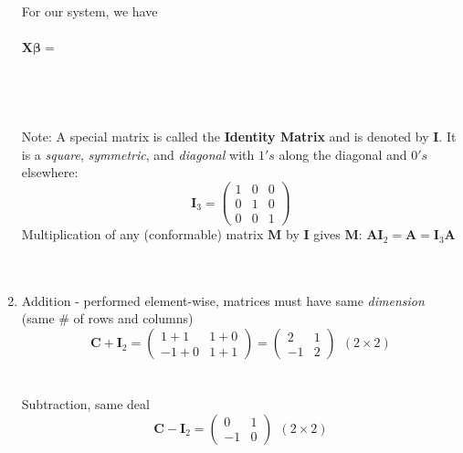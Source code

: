 \begin{enumerate}
For our system, we have\\~\\
$\textbf{X}\boldsymbol{\beta}=$\\~\\~\\~\\~\\

Note: A special matrix is called the \textbf{Identity Matrix} and is denoted by $\textbf{I}$.  It is a {\em square},
{\em symmetric}, and {\em diagonal} with $1's$ along the diagonal and $0's$
elsewhere:
$$\textbf{I}_3 = \left(\begin{array}{ccc} 1 & 0 & 0 \\ 0 & 1 & 0 \\ 0 & 0 & 1 \end{array}\right) $$
Multiplication of any (conformable) matrix $\textbf{M}$ by $\textbf{I}$ gives $\textbf{M}$:
$\textbf{AI}_2 = \textbf{A} = \textbf{I}_3 \textbf{A}$
~\\~\\

\item Addition - performed element-wise, matrices must have same {\em dimension} (same \# of rows and columns)
\[ 
\textbf{C} + \textbf{I}_2 = 
\left(\begin{array}{cc} 1 + 1 & 1 + 0 \\ -1 + 0  & 1 + 1 \end{array}\right) 
=
\left(\begin{array}{cc} 2 & 1 \\ -1 & 2 \end{array}\right) \ \ (2 \times 2)
\]
~\\~\\
Subtraction, same deal
\[ 
\textbf{C} - \textbf{I}_2 = \left(\begin{array}{cc} 0 & 1 \\ -1 & 0 \end{array}\right) \ \ (2 \times 2)
\]
~\\~\\


\end{enumerate}
